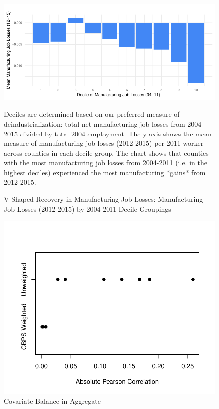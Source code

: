 \documentclass[]{AEA}
\begin{document}
\begin{figure} 
\caption{V-Shaped Recovery in Manufacturing Job Losses: Manufacturing Job Losses (2012-2015) by 2004-2011 Decile Groupings}
\label{vShapePlot2}

\begin{center}\includegraphics{Final-Draft_files/figure-latex/unnamed-chunk-11-1} \end{center}



\FloatBarrier

\begin{figurenotes}
Deciles are determined based on our preferred measure of deindustrialization: total net manufacturing job losses from 2004-2015 divided by total 2004 employment. The y-axis shows the mean measure of manufacturing job losses (2012-2015) per 2011 worker across counties in each decile group. The chart shows that counties with the most manufacturing job losses from 2004-2011 (i.e. in the highest deciles) experienced the most manufacturing *gains* from 2012-2015.
\end{figurenotes}
\end{figure}

\begin{figure} 
\caption{Covariate Balance in Aggregate}
\label{balPlot}

\begin{center}\includegraphics{Final-Draft_files/figure-latex/unnamed-chunk-12-1} \end{center}



\FloatBarrier

\end{figure}
\end{document}
